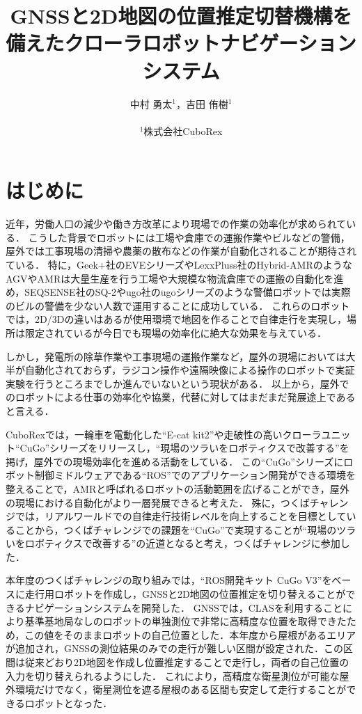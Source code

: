 \documentclass[platex,dvipdfmx]{rbproceedings}
\title{GNSSと2D地図の位置推定切替機構を備えたクローラロボットナビゲーションシステム}
\author{%
中村 勇太${}^{1}$，吉田 侑樹${}^{1}$\\ \\
${}^{1}$株式会社CuboRex
}
\begin{document}
\maketitle


\section{はじめに}
近年，労働人口の減少や働き方改革により現場での作業の効率化が求められている．
こうした背景でロボットには工場や倉庫での運搬作業やビルなどの警備，屋外では工事現場の清掃や農薬の散布などの作業が自動化されることが期待されている．
特に，Geek+社のEVEシリーズ\cite{geek_plus}やLexxPluss社のHybrid-AMR\cite{lexxpluss}のようなAGVやAMRは大量生産を行う工場や大規模な物流倉庫での運搬の自動化を進め，SEQSENSE社のSQ-2\cite{seqsense}やugo社のugoシリーズ\cite{ugo}のような警備ロボットでは実際のビルの警備を少ない人数で運用することに成功している．
これらのロボットでは，2D/3Dの違いはあるが使用環境で地図を作ることで自律走行を実現し，場所は限定されているが今日でも現場の効率化に絶大な効果を与えている．

しかし，発電所の除草作業や工事現場の運搬作業など，屋外の現場においては大半が自動化されておらず，ラジコン操作や遠隔映像による操作のロボットで実証実験を行うところまでしか進んでいないという現状がある．
以上から，屋外でのロボットによる仕事の効率化や協業，代替に対してはまだまだ発展途上であると言える．

CuboRexでは，一輪車を電動化した“E-cat kit2”\cite{e_cat}や走破性の高いクローラユニット“CuGo”シリーズ\cite{cugo}をリリースし，“現場のツラいをロボティクスで改善する”を掲げ，屋外での現場効率化を進める活動をしている．
この“CuGo”シリーズにロボット制御ミドルウェアである“ROS”でのアプリケーション開発ができる環境を整えることで，AMRと呼ばれるロボットの活動範囲を広げることができ，屋外の現場における自動化がより一層発展できると考えた．
殊に，つくばチャレンジでは，リアルワールドでの自律走行技術レベルを向上することを目標としていることから，つくばチャレンジでの課題を“CuGo”で実現することが“現場のツラいをロボティクスで改善する”の近道となると考え，つくばチャレンジに参加した．

本年度のつくばチャレンジの取り組みでは，“ROS開発キット CuGo V3”\cite{cugo_ros}をベースに走行用ロボットを作成し，GNSSと2D地図の位置推定を切り替えることができるナビゲーションシステムを開発した．
GNSSでは，CLAS\cite{clas}を利用することにより基準基地局なしのロボットの単独測位で非常に高精度な位置を取得できたため，この値をそのままロボットの自己位置とした．本年度から屋根があるエリアが追加され，GNSSの測位結果のみでの走行が難しい区間が設定された．この区間は従来どおり2D地図を作成し位置推定することで走行し，両者の自己位置の入力を切り替えられるようにした．
これにより，高精度な衛星測位が可能な屋外環境だけでなく，衛星測位を遮る屋根のある区間も安定して走行することができるロボットとなった．
\end{document}
